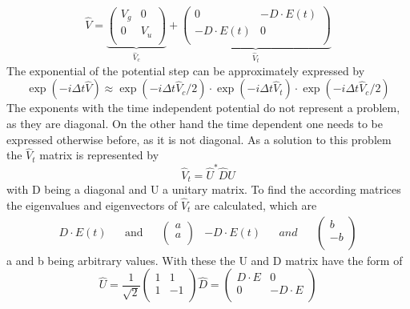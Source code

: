 \documentclass[12pt]{article}
\newcommand{\dt}{\Delta t}
\begin{document}
\begin{equation}
\hat V=\underbrace{
\begin{pmatrix}
V_g & 0\\
0 & V_u\\
\end{pmatrix}}_{\hat V_c}
+ \underbrace{
\begin{pmatrix}
0 & -D\cdot E(t)\\
-D\cdot E(t) & 0\\
\end{pmatrix}}_{\hat V_t}
\end{equation}
The exponential of the potential step can be approximately expressed by
\begin{equation}
\exp(-i\dt\hat V)\approx \exp(-i\dt\hat V_c/2)\cdot \exp(-i \dt\hat V_t) \cdot \exp(-i \dt\hat V_c/2)
\end{equation}
The exponents with the time independent potential do not represent a problem, as they are diagonal. On the other hand the time dependent one needs to be expressed otherwise before, as it is not diagonal.
As a solution to this problem the $\hat V_t$ matrix is represented by 
\begin{equation}
\hat V_t=\hat U^*\hat D\hat U
\end{equation}
with D being a diagonal and U a unitary matrix.
To find the according matrices the eigenvalues and eigenvectors of $\hat V_t$ are calculated, which are 
\begin{subequations}
\begin{align}
D\cdot E(t) &&\text{and} && \begin{pmatrix}
a\\
a\\
\end{pmatrix}
\end{align}
\begin{align}
-D\cdot E(t) && and & &\begin{pmatrix}
b\\
-b\\
\end{pmatrix}
\end{align}
\end{subequations}
a and b being arbitrary values.
With these the U and D matrix have the form of
\begin{subequations}
\begin{equation}
\hat U= \frac{1}{\sqrt{2}}\begin{pmatrix}
1 & 1\\
1 & -1\\
\end{pmatrix}
\end{equation}
\begin{equation}
\hat D=\begin{pmatrix}
D \cdot E & 0\\
0 & -D \cdot E\\
\end{pmatrix}
\end{equation}
\end{subequations}
\end{document}
